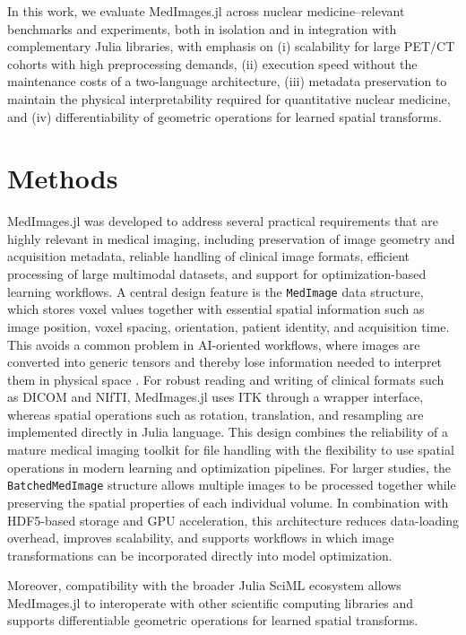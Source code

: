 \documentclass[a4paper,10pt]{elsarticle}
\begin{document}
In this work, we evaluate MedImages.jl across nuclear medicine–relevant benchmarks and experiments, both in isolation and in integration with complementary Julia libraries, with emphasis on (i) scalability for large PET/CT cohorts with high preprocessing demands, (ii) execution speed without the maintenance costs of a two-language architecture, (iii)  metadata preservation to maintain the physical interpretability required for quantitative nuclear medicine, and (iv) differentiability of geometric operations for learned spatial transforms.


\section{Methods}

MedImages.jl was developed to address several practical requirements that are highly relevant in medical imaging, including preservation of image geometry and acquisition metadata, reliable handling of clinical image formats, efficient processing of large multimodal datasets, and support for optimization-based learning workflows. 
A central design feature is the \verb|MedImage| data structure, which stores voxel values together with essential spatial information such as image position, voxel spacing, orientation, patient identity, and acquisition time. This avoids a common problem in AI-oriented workflows, where images are converted into generic tensors and thereby lose information needed to interpret them in physical space \cite{}. 
For robust reading and writing of clinical formats such as DICOM and NIfTI, MedImages.jl uses ITK through a wrapper interface, whereas spatial operations such as rotation, translation, and resampling are implemented directly in Julia language. This design combines the reliability of a mature medical imaging toolkit for file handling with the flexibility to use spatial operations in modern learning and optimization pipelines. 
For larger studies, the \verb|BatchedMedImage| structure allows multiple images to be processed together while preserving the spatial properties of each individual volume. In combination with HDF5-based storage and GPU acceleration, this architecture reduces data-loading overhead, improves scalability, and supports workflows in which image transformations can be incorporated directly into model optimization.  

Moreover, compatibility with the broader Julia SciML ecosystem allows MedImages.jl to interoperate with other scientific computing libraries and supports differentiable geometric operations for learned spatial transforms.  
\end{document}
